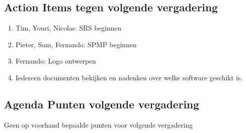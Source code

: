 \subsection{Action Items tegen volgende vergadering}
\begin{enumerate}
	\item Tim, Youri, Nicolas: SRS beginnen
	\item Pieter, Sam, Fernando: SPMP beginnen
	\item Fernando: Logo ontwerpen
	\item Iedereen documenten bekijken en nadenken over welke software geschikt is.
\end{enumerate}

\subsection{Agenda Punten volgende vergadering}

Geen op voorhand bepaalde punten voor volgende vergadering